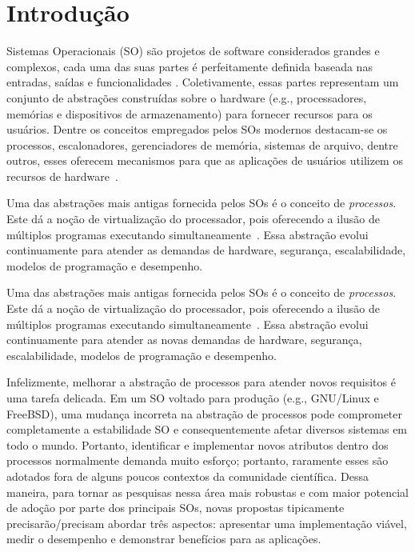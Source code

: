\chapter{Introdução}
\label{cap:introducao}

Sistemas Operacionais (SO) são projetos de software considerados grandes e
complexos, cada uma das suas partes é perfeitamente definida baseada nas
entradas, saídas e funcionalidades \citep{silberschatz}. Coletivamente, essas
partes representam um conjunto de abstrações construídas sobre o hardware
(e.g., processadores, memórias e dispositivos de armazenamento) para fornecer
recursos para os usuários. Dentre os conceitos empregados pelos SOs modernos
destacam-se os processos, escalonadores, gerenciadores de memória, sistemas de
arquivo, dentre outros, esses oferecem mecanismos para que as aplicações de
usuários utilizem os recursos de hardware~\citep{tanenbaum}.

Uma das abstrações mais antigas fornecida pelos SOs é o conceito de
\textit{processos}. Este dá a noção de virtualização do processador, pois
oferecendo a ilusão de múltiplos programas executando
simultaneamente~\citep{love, tanenbaum}. Essa abstração evolui continuamente
para atender as demandas de hardware, segurança, escalabilidade, modelos de
programação e desempenho.

Uma das abstrações mais antigas fornecida pelos SOs é o conceito de
\textit{processos}. Este dá a noção de virtualização do processador, pois
oferecendo a ilusão de múltiplos programas executando
simultaneamente~\citep{love, tanenbaum}. Essa abstração evolui continuamente
para atender as novas demandas de hardware, segurança, escalabilidade, modelos
de programação e desempenho.

Infelizmente, melhorar a abstração de processos para atender novos requisitos é
uma tarefa delicada. Em um SO voltado para produção (e.g., GNU/Linux e
FreeBSD), uma mudança incorreta na abstração de processos pode comprometer
completamente a estabilidade SO e consequentemente afetar diversos sistemas em
todo o mundo. Portanto, identificar e implementar novos atributos dentro dos
processos normalmente demanda muito esforço; portanto, raramente esses  são
adotados fora de alguns poucos contextos da comunidade científica. Dessa
maneira, para tornar as pesquisas nessa área mais robustas e com maior
potencial de adoção por parte dos principais SOs, novas propostas tipicamente
precisarão/precisam abordar três aspectos: apresentar uma implementação viável,
medir o desempenho e demonstrar benefícios para as aplicações.


